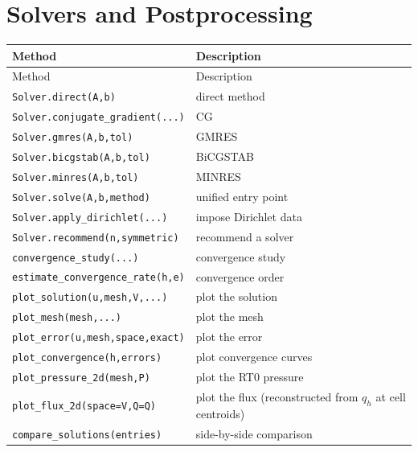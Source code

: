 \documentclass[11pt,oneside]{book}
\theoremstyle{definition}
\theoremstyle{plain}
\newcommand{\code}[1]{\texttt{#1}}
\begin{document}
\section{Solvers and Postprocessing}

\begingroup\small
\begin{longtable}{@{}L{5.0cm}L{9.4cm}@{}}
\toprule
Method & Description \\
\midrule
\endfirsthead
\toprule
Method & Description \\
\midrule
\endhead
\code{Solver.direct(A,\allowbreak b)} & direct method \\
\code{Solver.conjugate\_\allowbreak gradient(...)} & CG \\
\code{Solver.gmres(A,\allowbreak b,\allowbreak tol)} & GMRES \\
\code{Solver.bicgstab(A,\allowbreak b,\allowbreak tol)} & BiCGSTAB \\
\code{Solver.minres(A,\allowbreak b,\allowbreak tol)} & MINRES \\
\code{Solver.solve(A,\allowbreak b,\allowbreak method)} & unified entry point \\
\code{Solver.apply\_\allowbreak dirichlet(...)} & impose Dirichlet data \\
\code{Solver.recommend(n,\allowbreak  symmetric)} & recommend a solver \\
\code{convergence\_\allowbreak study(...)} & convergence study \\
\code{estimate\_\allowbreak convergence\_\allowbreak rate(h,\allowbreak  e)} & convergence order \\
\code{plot\_\allowbreak solution(u,\allowbreak  mesh,\allowbreak  V,\allowbreak  ...)} & plot the solution \\
\code{plot\_\allowbreak mesh(mesh,\allowbreak  ...)} & plot the mesh \\
\code{plot\_\allowbreak error(u,\allowbreak  mesh,\allowbreak  space,\allowbreak  exact)} & plot the error \\
\code{plot\_\allowbreak convergence(h,\allowbreak  errors)} & plot convergence curves \\
\code{plot\_\allowbreak pressure\_\allowbreak 2d(mesh,\allowbreak  P)} & plot the RT0 pressure \\
\code{plot\_\allowbreak flux\_\allowbreak 2d(space=V,\allowbreak  Q=Q)} & plot the flux (reconstructed from $q_h$ at cell centroids) \\
\code{compare\_\allowbreak solutions(entries)} & side-by-side comparison \\
\bottomrule
\end{longtable}
\endgroup
\end{document}
